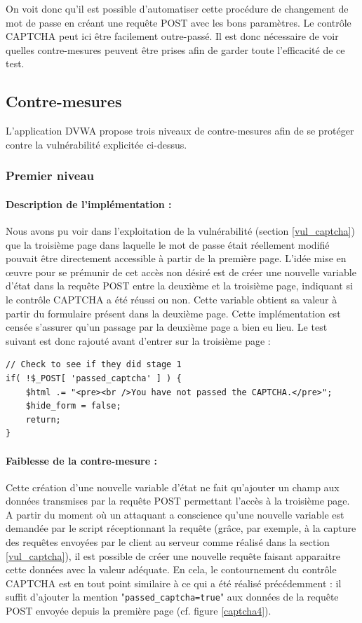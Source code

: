 On voit donc qu'il est possible d'automatiser cette procédure de changement de mot de passe en créant une requête POST avec les bons paramètres. Le contrôle CAPTCHA peut ici être facilement outre-passé. Il est donc nécessaire de voir quelles contre-mesures peuvent être prises afin de garder toute l'efficacité de ce test. 

\subsection{Contre-mesures}

L'application DVWA propose trois niveaux de contre-mesures afin de se protéger contre la vulnérabilité explicitée ci-dessus.

\subsubsection{Premier niveau}

\paragraph{Description de l'implémentation :}

Nous avons pu voir dans l'exploitation de la vulnérabilité (section \ref{vul_captcha}) que la troisième page dans laquelle le mot de passe était réellement modifié pouvait être directement accessible à partir de la première page. L'idée mise en œuvre pour se prémunir de cet accès non désiré est de créer une nouvelle variable d'état dans la requête POST entre la deuxième et la troisième page, indiquant si le contrôle CAPTCHA a été réussi ou non. Cette variable obtient sa valeur à partir du formulaire présent dans la deuxième page. Cette implémentation est censée s'assurer qu'un passage par la deuxième page a bien eu lieu. Le test suivant est donc rajouté avant d'entrer sur la troisième page :

\begin{lstlisting}
// Check to see if they did stage 1
if( !$_POST[ 'passed_captcha' ] ) {
    $html .= "<pre><br />You have not passed the CAPTCHA.</pre>";
    $hide_form = false;
    return;
} 
\end{lstlisting}

\paragraph{Faiblesse de la contre-mesure :} Cette création d'une nouvelle variable d'état ne fait qu'ajouter un champ aux données transmises par la requête POST permettant l'accès à la troisième page. A partir du moment où un attaquant a conscience qu'une nouvelle variable est demandée par le script réceptionnant la requête (grâce, par exemple, à la capture des requêtes envoyées par le client au serveur comme réalisé dans la section \ref{vul_captcha}), il est possible de créer une nouvelle requête faisant apparaitre cette données avec la valeur adéquate. En cela, le contournement du contrôle CAPTCHA est en tout point similaire à ce qui a été réalisé précédemment : il suffit d'ajouter la mention "\texttt{passed\_captcha=true}" aux données de la requête POST envoyée depuis la première page (cf. figure \ref{captcha4}).

